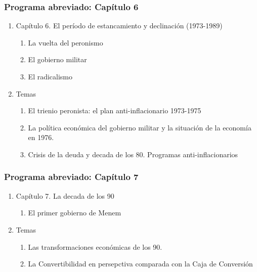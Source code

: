 \documentclass[14pt,aspectratio=169]{beamer}
\begin{document}
 \begin{frame}\frametitle{Programa abreviado: Capítulo 6}
     \begin{enumerate}
     \item Capítulo 6. El período de estancamiento y declinación (1973-1989)
       \begin{enumerate}
       \item La vuelta del peronismo
       \item El gobierno militar
         \item El radicalismo
      \end{enumerate}
     \item Temas
       \begin{enumerate}
       \item El trienio peronista: el plan anti-inflacionario 1973-1975
       \item La política económica del gobierno militar y la situación
         de la economía en 1976.
       \item Crisis de la deuda y decada de los 80. Programas anti-inflacionarios
         \end{enumerate}
         \end{enumerate}
  \end{frame}


 \begin{frame}\frametitle{Programa abreviado: Capítulo 7}
     \begin{enumerate}
     \item Capítulo 7. La decada de los 90 
       \begin{enumerate}
       \item El primer gobierno de Menem
             \end{enumerate}
     \item Temas
       \begin{enumerate}
       \item Las transformaciones económicas de los 90.
         \item La Convertibilidad en persepctiva comparada con la Caja
           de Conversión
         \end{enumerate}
         \end{enumerate}
  \end{frame}
  
\end{document}
